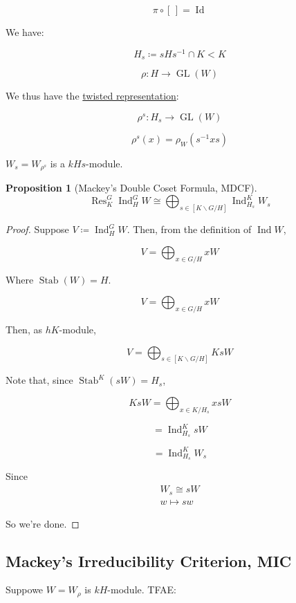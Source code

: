 \documentclass{article}
\theoremstyle{definition}
\newtheorem{proposition}[theorem]{Proposition}
\begin{document}
\[
    \pi \circ [\,] = \operatorname{Id} 
\]

We have:

\[
    H_s \coloneqq s H s ^{-1} \cap K < K
\]

\[
    \rho : H \to \operatorname{GL} (W)
\]

We thus have the \underline{twisted representation}:

\[
    \rho^s : H_s \to \operatorname{GL} (W)
\]

\[
    \rho^s(x) = \rho_W(s ^{-1} x s)
\]

\(W_s = W_{\rho^s}\) is a \(kHs\)-module.

\begin{proposition}
    [Mackey's Double Coset Formula, MDCF]

    \[
        \operatorname{R es}^G_K \operatorname{Ind}_H^G W \cong \bigoplus_{s\in [K \backslash G / H]} \operatorname{Ind}^K_{H_s} W_s 
    \]
\end{proposition}

\begin{proof}
    Suppose \(V \coloneqq \operatorname{Ind}_H^G W\). Then, from the definition of \(\operatorname{Ind} W\),

    \[
        V = \bigoplus_{x\in G / H} xW
    \]

    Where \(\operatorname{Stab} (W) = H\).

    \[
        V = \bigoplus_{x\in G / H} xW
    \]

    Then, as \(hK\)-module,

    \[
        V = \bigoplus_{s \in [K\backslash G / H]} KsW 
    \]

    Note that, since \(\operatorname{Stab}^K (sW) = H_s\),

    \[
        KsW = \bigoplus_{x\in K / H_s} xsW 
    \]

    \[
        = \operatorname{Ind}^K_{H_s} sW
    \]

    \[
        = \operatorname{Ind}_{H_s} ^K W_s
    \]

    Since 
    \[
        \begin{matrix}
            W_s \cong sW \\ w \mapsto sw
        \end{matrix}
    \]
        
    So we're done.

\end{proof}

\subsection*{Mackey's Irreducibility Criterion, MIC} Suppowe \(W = W_{\rho}\) is \(kH\)-module. TFAE:
\end{document}

